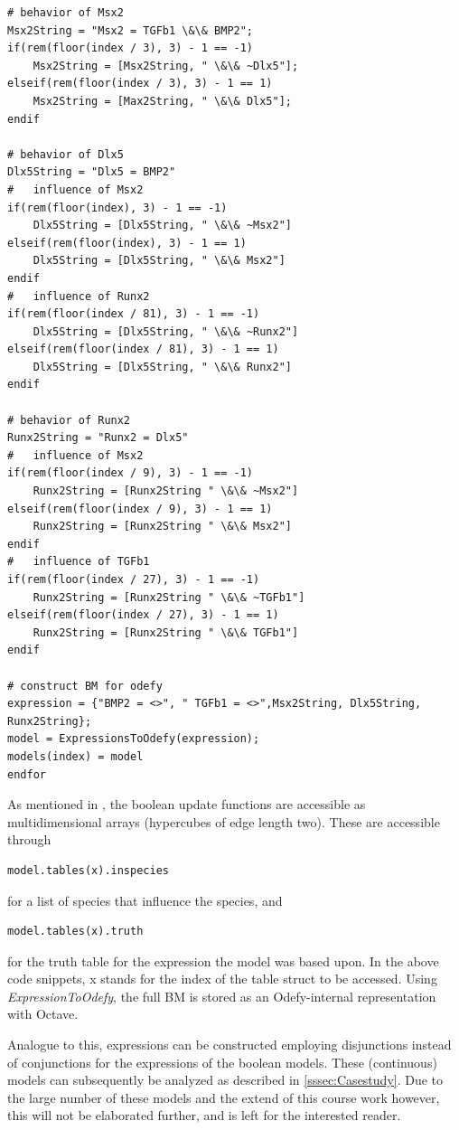 \documentclass[11pt]{article}
\begin{document}
\begin{appendices}
\begin{lstlisting}[breaklines=true]
# behavior of Msx2
Msx2String = "Msx2 = TGFb1 \&\& BMP2";
if(rem(floor(index / 3), 3) - 1 == -1)
	Msx2String = [Msx2String, " \&\& ~Dlx5"];
elseif(rem(floor(index / 3), 3) - 1 == 1)
	Msx2String = [Max2String, " \&\& Dlx5"];
endif

# behavior of Dlx5
Dlx5String = "Dlx5 = BMP2"
#	influence of Msx2
if(rem(floor(index), 3) - 1 == -1)
	Dlx5String = [Dlx5String, " \&\& ~Msx2"]
elseif(rem(floor(index), 3) - 1 == 1)
	Dlx5String = [Dlx5String, " \&\& Msx2"]
endif
#	influence of Runx2
if(rem(floor(index / 81), 3) - 1 == -1)
	Dlx5String = [Dlx5String, " \&\& ~Runx2"]
elseif(rem(floor(index / 81), 3) - 1 == 1)
	Dlx5String = [Dlx5String, " \&\& Runx2"]
endif

# behavior of Runx2
Runx2String = "Runx2 = Dlx5"
#	influence of Msx2
if(rem(floor(index / 9), 3) - 1 == -1)
	Runx2String = [Runx2String " \&\& ~Msx2"]
elseif(rem(floor(index / 9), 3) - 1 == 1)
	Runx2String = [Runx2String " \&\& Msx2"]
endif
#	influence of TGFb1
if(rem(floor(index / 27), 3) - 1 == -1)
	Runx2String = [Runx2String " \&\& ~TGFb1"]
elseif(rem(floor(index / 27), 3) - 1 == 1)
	Runx2String = [Runx2String " \&\& TGFb1"]
endif

# construct BM for odefy
expression = {"BMP2 = <>", " TGFb1 = <>",Msx2String, Dlx5String, Runx2String};
model = ExpressionsToOdefy(expression);
models(index) = model
endfor
\end{lstlisting}

As mentioned in \cite{Krumsiek}, the boolean update functions are accessible as multidimensional arrays (hypercubes of edge length two). These are accessible through
\begin{lstlisting}
model.tables(x).inspecies
\end{lstlisting}

for a list of species that influence the species, and
\begin{lstlisting}
model.tables(x).truth
\end{lstlisting}

for the truth table for the expression the model was based upon. In the above code snippets, x stands for the index of the table struct to be accessed. Using \textit{ExpressionToOdefy}, the full BM is stored as an Odefy-internal representation with Octave.

Analogue to this, expressions can be constructed employing disjunctions instead of conjunctions for the expressions of the boolean models.
These (continuous) models can subsequently be analyzed as described in \ref{sssec:Casestudy}. Due to the large number of these models and the extend of this course work however, this will not be elaborated further, and is left for the interested reader.


\end{appendices}
\end{document}
